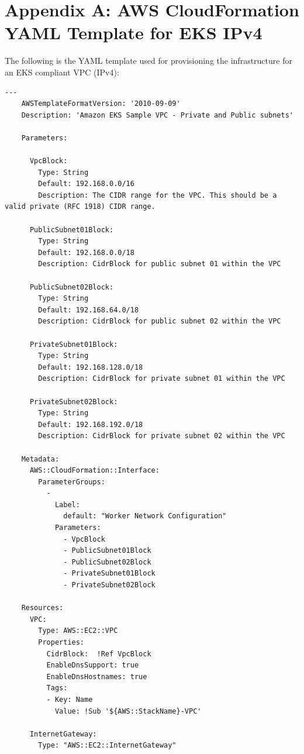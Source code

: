 \chapter{Appendix A: AWS CloudFormation YAML Template for EKS IPv4}
\label{appendix:cloudformation-eks-vpc-yaml}

The following is the YAML template used for provisioning the infrastructure for an EKS compliant VPC (IPv4):

\begin{lstlisting}[caption={AWS CloudFormation YAML Template for EKS IPv4}]
    ---
    AWSTemplateFormatVersion: '2010-09-09'
    Description: 'Amazon EKS Sample VPC - Private and Public subnets'
    
    Parameters:
    
      VpcBlock:
        Type: String
        Default: 192.168.0.0/16
        Description: The CIDR range for the VPC. This should be a valid private (RFC 1918) CIDR range.
    
      PublicSubnet01Block:
        Type: String
        Default: 192.168.0.0/18
        Description: CidrBlock for public subnet 01 within the VPC
    
      PublicSubnet02Block:
        Type: String
        Default: 192.168.64.0/18
        Description: CidrBlock for public subnet 02 within the VPC
    
      PrivateSubnet01Block:
        Type: String
        Default: 192.168.128.0/18
        Description: CidrBlock for private subnet 01 within the VPC
    
      PrivateSubnet02Block:
        Type: String
        Default: 192.168.192.0/18
        Description: CidrBlock for private subnet 02 within the VPC
    
    Metadata:
      AWS::CloudFormation::Interface:
        ParameterGroups:
          -
            Label:
              default: "Worker Network Configuration"
            Parameters:
              - VpcBlock
              - PublicSubnet01Block
              - PublicSubnet02Block
              - PrivateSubnet01Block
              - PrivateSubnet02Block
    
    Resources:
      VPC:
        Type: AWS::EC2::VPC
        Properties:
          CidrBlock:  !Ref VpcBlock
          EnableDnsSupport: true
          EnableDnsHostnames: true
          Tags:
          - Key: Name
            Value: !Sub '${AWS::StackName}-VPC'
    
      InternetGateway:
        Type: "AWS::EC2::InternetGateway"
    

\end{lstlisting}
